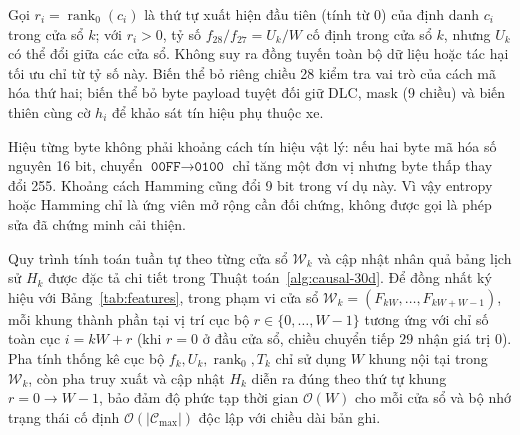 \documentclass[12pt, a4paper, reqno, oneside]{book}
\begin{document}
Gọi $r_i = \operatorname{rank}_0(c_i)$ là thứ tự xuất hiện đầu tiên (tính từ $0$) của định danh $c_i$ trong cửa sổ $k$; với $r_i > 0$, tỷ số $f_{28}/f_{27}=U_k/W$ cố định trong cửa sổ $k$, nhưng $U_k$ có thể đổi giữa các cửa sổ. Không suy ra đồng tuyến toàn bộ dữ liệu hoặc tác hại tối ưu chỉ từ tỷ số này. Biến thể bỏ riêng chiều 28 kiểm tra vai trò của cách mã hóa thứ hai; biến thể bỏ byte payload tuyệt đối giữ DLC, mask (9 chiều) và biến thiên cùng cờ $h_i$ để khảo sát tín hiệu phụ thuộc xe.

Hiệu từng byte không phải khoảng cách tín hiệu vật lý: nếu hai byte mã hóa số nguyên 16 bit, chuyển $\texttt{00FF}\rightarrow\texttt{0100}$ chỉ tăng một đơn vị nhưng byte thấp thay đổi 255. Khoảng cách Hamming cũng đổi 9 bit trong ví dụ này. Vì vậy entropy hoặc Hamming chỉ là ứng viên mở rộng cần đối chứng, không được gọi là phép sửa đã chứng minh cải thiện.

Quy trình tính toán tuần tự theo từng cửa sổ $\mathcal{W}_k$ và cập nhật nhân quả bảng lịch sử $H_k$ được đặc tả chi tiết trong Thuật toán~\ref{alg:causal-30d}. Để đồng nhất ký hiệu với Bảng~\ref{tab:features}, trong phạm vi cửa sổ $\mathcal{W}_k=(F_{kW},\ldots,F_{kW+W-1})$, mỗi khung thành phần tại vị trí cục bộ $r \in \{0,\ldots,W-1\}$ tương ứng với chỉ số toàn cục $i = kW + r$ (khi $r=0$ ở đầu cửa sổ, chiều chuyển tiếp $29$ nhận giá trị $0$). Pha tính thống kê cục bộ $f_k, U_k, \operatorname{rank}_0, T_k$ chỉ sử dụng $W$ khung nội tại trong $\mathcal{W}_k$, còn pha truy xuất và cập nhật $H_k$ diễn ra đúng theo thứ tự khung $r=0 \to W-1$, bảo đảm độ phức tạp thời gian $\mathcal{O}(W)$ cho mỗi cửa sổ và bộ nhớ trạng thái cố định $\mathcal{O}(|\mathcal{C}_{\max}|)$ độc lập với chiều dài bản ghi.
\end{document}
